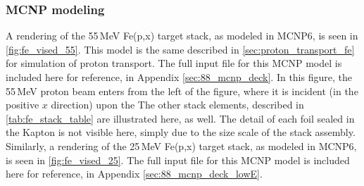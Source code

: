 \subsubsection{MCNP modeling}




A rendering of the 55\,MeV Fe(p,x) target stack, as modeled in MCNP6, is seen in \autoref{fig:fe_vised_55}.
This model is the same described in \autoref{sec:proton_transport_fe} for simulation of proton transport.
The full input file for this MCNP model is included here for reference, in Appendix \ref{sec:88_mcnp_deck}.
In this figure, the 55\,MeV proton beam enters from the left of the figure, where it is incident (in the positive $x$ direction) upon the 
The other stack elements, described in  \autoref{tab:fe_stack_table} are illustrated here, as well.
The detail of each foil sealed in the Kapton is not visible here, simply due to the size scale of the stack assembly.
Similarly, a rendering of the 25\,MeV Fe(p,x) target stack, as modeled in MCNP6, is seen in \autoref{fig:fe_vised_25}.
The full input file for this MCNP model is included here for reference, in Appendix \ref{sec:88_mcnp_deck_lowE}.






